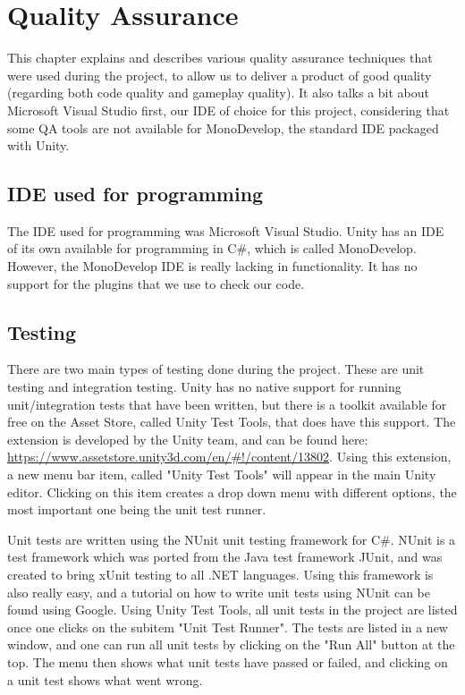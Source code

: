 \chapter{Quality Assurance} \label{cha:qa}
	This chapter explains and describes various quality assurance techniques 
	that were used during the project, to allow us to deliver a product of 
	good quality (regarding both code quality and gameplay quality). It also
	talks a bit about Microsoft Visual Studio first, our IDE of choice for
	this project, considering that some QA tools are not available for
	MonoDevelop, the standard IDE packaged with Unity.
	\section{IDE used for programming} \label{sec:ide}
	The IDE used for programming was Microsoft Visual Studio. Unity has an IDE
	of its own available for programming in C\#, which is called MonoDevelop.
	However, the MonoDevelop IDE is really lacking in functionality. It has no
	support for the plugins that we use to check our code. 
	
	\section{Testing} \label{sec:testing}
	There are two main types of testing done during the project. These are
	unit testing and integration testing. Unity has no native support for
	running unit/integration tests that have been written, but there is a toolkit
	available for free on the Asset Store, called Unity Test Tools, that does
	have this support. The extension is developed by the Unity team, and can be 
	found here: \url{https://www.assetstore.unity3d.com/en/#!/content/13802}.
	Using this extension, a new menu bar item, called "Unity Test Tools"
	will appear in the main Unity editor. Clicking on this item creates a drop
	down menu with different options, the most important one being the unit test
	runner.
	
	Unit tests are written using the NUnit unit testing framework for C\#. NUnit
	is a test framework which was ported from the Java test framework JUnit, and
	was created to bring xUnit testing to all .NET languages. Using this framework
	is also really easy, and a tutorial on how to write unit tests using NUnit
	can be found using Google. Using Unity Test Tools, all unit tests in the
	project are listed once one clicks on the subitem "Unit Test Runner".
	The tests are listed in a new window, and one can run all unit tests by
	clicking on the "Run All" button at the top. The menu then shows what unit tests
	have passed or failed, and clicking on a unit test shows what went wrong.
	

